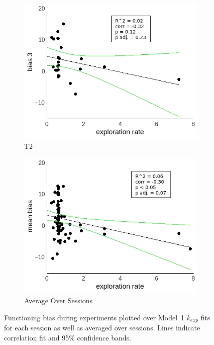 \documentclass[a4paper]{scrreprt}
\begin{document}
\begin{figure}
\begin{subfigure}[b]{0.49\textwidth}
        \includegraphics[width=\textwidth]{figs/sec3/temp/temp_diff_3_mod1dat.jpeg}
        \caption{T2}
    \end{subfigure}
    \begin{subfigure}[b]{0.49\textwidth}
        \includegraphics[width=\textwidth]{figs/sec3/temp/temp_diff_mean_mod1dat.jpeg}
        \caption{Average Over Sessions}
    \end{subfigure}
\caption{Functioning bias during experiments plotted over Model~1 $k_{exp}$ fits for each session as well as averaged over sessions. Lines indicate correlation fit and 95\% confidence bands.}
\label{fig:temp_diff_mod1dat}
\end{figure}
\end{document}
